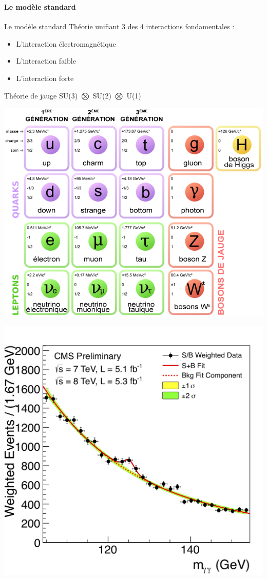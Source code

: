 \documentclass[8pt]{beamer}
\begin{document}
  \begin{frame}
  \frametitle{\secname}
  \framesubtitle{Le modèle standard}
    \begin{minipage}{0.6\linewidth}
      \begin{block}{Le modèle standard}
        Théorie unifiant 3 des 4 interactions fondamentales :
        \begin{itemize}
          \item L'interaction électromagnétique
          \item L'interaction faible
          \item L'interaction forte
        \end{itemize}
        Théorie de jauge SU(3) $\bigotimes$ SU(2) $\bigotimes$ U(1)
      \end{block}
    \end{minipage} \hfill
    \begin{minipage}{0.38\linewidth}
      \includegraphics[width=0.9\linewidth]{Particules_elementaires.png}
    \end{minipage}
    \begin{minipage}{0.48\linewidth}
      \includegraphics[width=0.9\linewidth]{CMS_Higgs_plot.png}

\end{minipage}
\end{frame}
\end{document}
